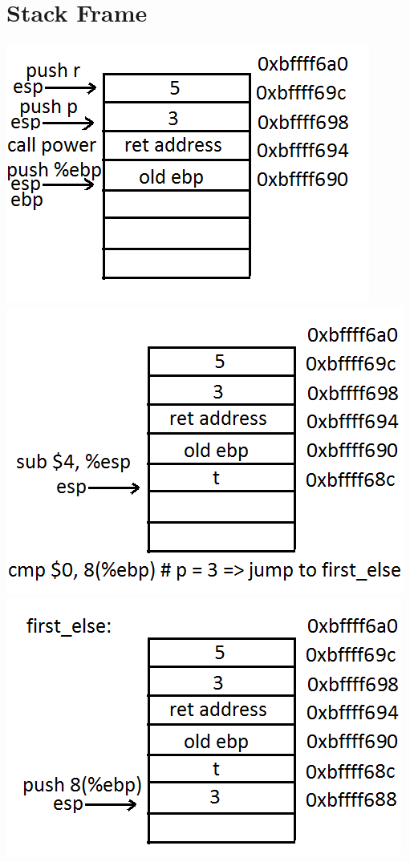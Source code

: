 \documentclass{article}
\begin{document}
\section{Stack Frame}
\includegraphics[scale=0.5]{stack1.png}
\includegraphics[scale=0.5]{stack2.png}\\
\includegraphics[scale=0.5]{stack3.png}
\end{document}
